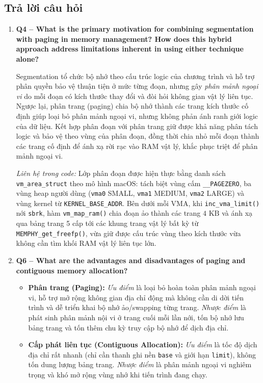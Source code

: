 \documentclass[12pt,a4paper]{article}
\begin{document}
    \subsection{Trả lời câu hỏi}
    \begin{enumerate}
        \item \textbf{Q4 -- What is the primary motivation for combining segmentation with paging in memory management? How does this hybrid approach address limitations inherent in using either technique alone?}
    
        Segmentation tổ chức bộ nhớ theo cấu trúc logic của chương trình và hỗ trợ phân quyền bảo vệ thuận tiện ở mức từng đoạn, nhưng gây \textit{phân mảnh ngoại vi} do mỗi đoạn có kích thước thay đổi và đòi hỏi không gian vật lý liên tục. Ngược lại, phân trang (paging) chia bộ nhớ thành các trang kích thước cố định giúp loại bỏ phân mảnh ngoại vi, nhưng không phản ánh ranh giới logic của dữ liệu. Kết hợp phân đoạn với phân trang giữ được khả năng phân tách logic và bảo vệ theo vùng của phân đoạn, đồng thời chia nhỏ mỗi đoạn thành các trang cố định để ánh xạ rời rạc vào RAM vật lý, khắc phục triệt để phân mảnh ngoại vi.
    
        \textit{Liên hệ trong code:} Lớp phân đoạn được hiện thực bằng danh sách \texttt{vm\_area\_struct} theo mô hình macOS: tách biệt vùng cấm \texttt{\_\_PAGEZERO}, ba vùng heap người dùng (\texttt{vma0} SMALL, \texttt{vma1} MEDIUM, \texttt{vma2} LARGE) và vùng kernel từ \texttt{KERNEL\_BASE\_ADDR}. Bên dưới mỗi VMA, khi \texttt{inc\_vma\_limit()} nới \texttt{sbrk}, hàm \texttt{vm\_map\_ram()} chia đoạn ảo thành các trang $4\text{ KB}$ và ánh xạ qua bảng trang 5 cấp tới các khung trang vật lý bất kỳ từ \texttt{MEMPHY\_get\_freefp()}, vừa giữ được cấu trúc vùng theo kích thước vừa không cần tìm khối RAM vật lý liên tục lớn.
    
        \item \textbf{Q6 -- What are the advantages and disadvantages of paging and contiguous memory allocation?}

        \begin{itemize}
            \item \textbf{Phân trang (Paging):} \textit{Ưu điểm} là loại bỏ hoàn toàn phân mảnh ngoại vi, hỗ trợ mở rộng không gian địa chỉ động mà không cần di dời tiến trình và dễ triển khai bộ nhớ ảo/swapping từng trang. \textit{Nhược điểm} là phát sinh phân mảnh nội vi ở trang cuối mỗi lần nới, tốn bộ nhớ lưu bảng trang và tốn thêm chu kỳ truy cập bộ nhớ để dịch địa chỉ.
            \item \textbf{Cấp phát liên tục (Contiguous Allocation):} \textit{Ưu điểm} là tốc độ dịch địa chỉ rất nhanh (chỉ cần thanh ghi nền \texttt{base} và giới hạn \texttt{limit}), không tốn dung lượng bảng trang. \textit{Nhược điểm} là phân mảnh ngoại vi nghiêm trọng và khó mở rộng vùng nhớ khi tiến trình đang chạy.
        \end{itemize}
    

\end{enumerate}
\end{document}
